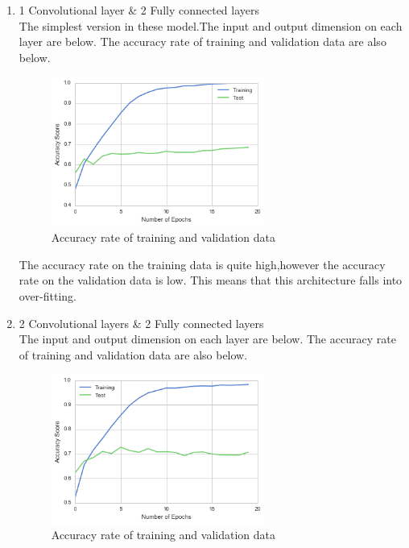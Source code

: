 \begin{enumerate}
 \item 1 Convolutional layer \& 2 Fully connected layers \\
 The simplest version in these model.The input and output dimension on each layer are below.
 The accuracy rate of training and validation data are also below.
 
 \begin{figure}[H]

	\begin{center}
	\includegraphics[width=7cm]{picture/1layer_cnn.png}
	\caption{Accuracy rate of training and validation data}
	\end{center}
	\label{fig:eight}

\end{figure}
 
 The accuracy rate on the training data is quite high,however the accuracy rate on the validation data is low. This means that this architecture falls into over-fitting.
 
 
 \item 2 Convolutional layers \& 2 Fully connected layers \\
 The input and output dimension on each layer are below.
 The accuracy rate of training and validation data are also below.
 
 \begin{figure}[H]

	\begin{center}
	\includegraphics[width=7cm]{picture/2layer_cnn.png}
	\caption{Accuracy rate of training and validation data}
	\end{center}
	\label{fig:nine}


\end{figure}
\end{enumerate}
